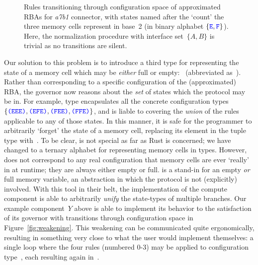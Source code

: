 \begin{figure}[ht]
	\centering
	\footnotesize
	\caption[Configuration space of the a7b1 connector.]{Rules transitioning through configuration space of approximated RBAs for \textit{a7b1} connector, with states named after the `count' the three memory cells represent in base~2 (in binary alphabet $\{\text{\textcolor{blue}{\texttt{E}}}, \text{\textcolor{blue}{\texttt{F}}}\}$). Here, the normalization procedure with interface set~$\{A,B\}$ is trivial as no transitions are silent.}
	\label{fig:counter_RBAs}
\end{figure}

Our solution to this problem is to introduce a third type for representing the state of a memory cell which may be \textit{either} full or empty:~ (abbreviated as~). Rather than corresponding to a specific configuration of the (approximated) RBA, the governor now reasons about the \textit{set} of states which the protocol may be in. For example, type  encapsulates all the concrete configuration types $\{\text{\textcolor{blue}{\texttt{(EEE)}}}, \text{\textcolor{blue}{\texttt{(EFE)}}}, \text{\textcolor{blue}{\texttt{(FEE)}}}, \text{\textcolor{blue}{\texttt{(FFE)}}}\}$, and is liable to covering the \textit{union} of the rules applicable to any of those states. In this manner, it is safe for the programmer to arbitrarily `forget' the state of a memory cell, replacing its element in the tuple type with~. To be clear,  is not special as far as Rust is concerned; we have changed to a ternary alphabet for representing memory cells in types. However,  does not correspond to any real configuration that memory cells are ever `really' in at runtime; they are always either empty or full.  is a stand-in for an empty \textit{or} full memory variable, an abstraction in which the protocol is not (explicitly) involved.
With this tool in their belt, the implementation of the compute component is able to arbitrarily \textit{unify} the state-types of multiple branches. Our example component~$Y$ above is able to implement its behavior to the satisfaction of its governor with transitions through configuration space in Figure~\ref{fig:weakening}. This weakening can be communicated quite ergonomically, resulting in something very close to what the user would implement themselves: a single loop where the four rules (numbered 0-3) may be applied to configuration type~, each resulting again in~.


